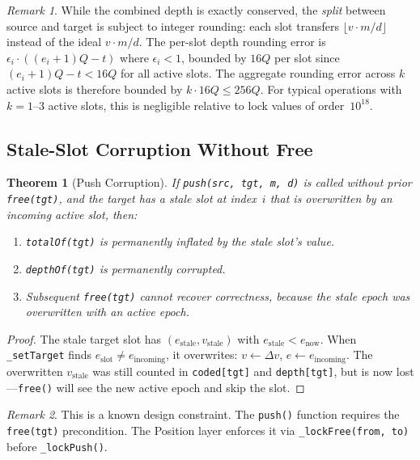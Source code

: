 \documentclass[10pt,a4paper,twocolumn]{article}
\theoremstyle{definition}
\theoremstyle{plain}
\newtheorem{theorem}{Theorem}[section]
\theoremstyle{remark}
\newtheorem{remark}{Remark}[section]
\begin{document}
\begin{remark}
While the combined depth is exactly conserved, the \emph{split} between source and target is subject to integer rounding: each slot transfers $\lfloor v \cdot m/d \rfloor$ instead of the ideal $v \cdot m/d$. The per-slot depth rounding error is $\epsilon_i \cdot ((e_i{+}1)Q - t)$ where $\epsilon_i < 1$, bounded by $16Q$ per slot since $(e_i{+}1)Q - t < 16Q$ for all active slots. The aggregate rounding error across $k$ active slots is therefore bounded by $k \cdot 16Q \leq 256Q$. For typical operations with $k = 1$--$3$ active slots, this is negligible relative to lock values of order~$10^{18}$.
\end{remark}

\subsection{Stale-Slot Corruption Without Free}

\begin{theorem}[Push Corruption]
\label{thm:push-corruption}
If \texttt{push(src, tgt, m, d)} is called without prior \texttt{free(tgt)}, and the target has a stale slot at index~$i$ that is overwritten by an incoming active slot, then:
\begin{enumerate}[nosep]
\item \texttt{totalOf(tgt)} is permanently inflated by the stale slot's value.
\item \texttt{depthOf(tgt)} is permanently corrupted.
\item Subsequent \texttt{free(tgt)} cannot recover correctness, because the stale epoch was overwritten with an active epoch.
\end{enumerate}
\end{theorem}

\begin{proof}
The stale target slot has $(e_{\text{stale}}, v_{\text{stale}})$ with $e_{\text{stale}} < e_{\text{now}}$. When \texttt{\_setTarget} finds $e_{\text{slot}} \neq e_{\text{incoming}}$, it overwrites: $v \leftarrow \Delta v$, $e \leftarrow e_{\text{incoming}}$. The overwritten $v_{\text{stale}}$ was still counted in \texttt{coded[tgt]} and \texttt{depth[tgt]}, but is now lost---\texttt{free()} will see the new active epoch and skip the slot.
\end{proof}

\begin{remark}
This is a known design constraint. The \texttt{push()} function requires the \texttt{free(tgt)} precondition. The Position layer enforces it via \texttt{\_lockFree(from, to)} before \texttt{\_lockPush()}.
\end{remark}
\end{document}
